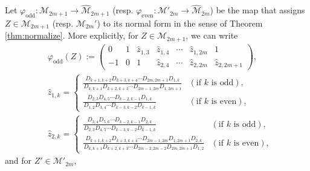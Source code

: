 \documentclass[11pt]{amsart}
\theoremstyle{plain}
\theoremstyle{definition}
\theoremstyle{remark}
\begin{document}
Let $\varphi_{\text{odd}}: \mathcal{M}_{2m+1} \rightarrow \widehat{\mathcal{M}}_{2m+1}$ (resp. $\varphi_{\text{even}}: \mathcal{M}'_{2m} \rightarrow \widehat{\mathcal{M}}_{2m}$) be the map that assigns $Z \in \mathcal{M}_{2m+1}$ (resp.
$\mathcal{M}_{2m}'$) to its normal form in the sense of Theorem \ref{thm:normalize}.
More explicitly, for $Z\in \mathcal{M}_{2m+1}$, we can write
\begin{equation}
\begin{aligned}
&\varphi_{\text{odd}}(Z):=
\begin{pmatrix}
0 & 1 & \displaystyle \widehat{z}_{1,3} & \widehat{z}_{1,4} & \cdots & \displaystyle \widehat{z}_{1,2m} & 1 \\[0pt]
-1 & 0 & 1 & \widehat{z}_{2,4} & \cdots & \widehat{z}_{2,2m} & \widehat{z}_{2,2m+1}
\end{pmatrix}, \\[15pt]
&\widehat{z}_{1,k} =
\begin{cases}
 \displaystyle\frac{D_{k+1,k+2} D_{k+3,k+4} \cdots D_{2m,2m+1} D_{1,k}}{D_{k,k+1} D_{k+2,k+3} \cdots D_{2m-1,2m} D_{1,2m+1}} & (\text{if } k \text{ is odd}),  \\[15pt]
\displaystyle\frac{D_{2,3} D_{4,5} \cdots D_{k-2,k-1} D_{1,k}}{D_{1,2} D_{3,4} \cdots D_{k-3, k-2}D_{k-1,k}} & (\text{if } k \text{ is even}),
\end{cases} \\[15pt]
&\widehat{z}_{2,k} =
\begin{cases}
\displaystyle\frac{D_{3,4} D_{5,6} \cdots D_{k-2,k-1} D_{2,k}}{D_{2,3} D_{4,5} \cdots D_{k-3, k-2}D_{k-1,k}} & (\text{if } k \text{ is odd}),  \\[15pt]
\displaystyle\frac{D_{k+1,k+2} D_{k+3,k+4} \cdots D_{2m-1,2m} D_{1,2m+1} D_{2,k}}{D_{k,k+1} D_{k+2,k+3} \cdots D_{2m-2,2m-2}D_{2m,2m+1} D_{1,2}} & (\text{if } k \text{ is even}),
\end{cases}
\end{aligned}\label{eq:hatZ1k}
\end{equation}
and for $Z'\in \mathcal{M}'_{2m}$,
\end{document}
